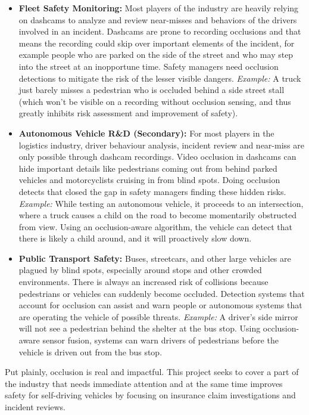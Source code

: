 \documentclass[12pt,a4paper]{report}
\theoremstyle{definition}
\theoremstyle{remark}
\begin{document}
\begin{itemize}
    \item \textbf{Fleet Safety Monitoring:} 
Most players of the industry are heavily relying on dashcams to analyze and review near-misses and behaviors of the drivers involved in an incident. Dashcams are prone to recording occlusions and that means the recording could skip over important elements of the incident, for example people who are parked on the side of the street and who may step into the street at an inopportune time. Safety managers need occlusion detections to mitigate the risk of the lesser visible dangers.
\textit{Example:} A truck just barely misses a pedestrian who is occluded behind a side street stall (which won't be visible on a recording without occlusion sensing, and thus greatly inhibits risk assessment and improvement of safety).

    \item \textbf{Autonomous Vehicle R\&D (Secondary):} 
For most players in the logistics industry, driver behaviour analysis, incident review and near-miss are only possible through dashcam recordings. Video occlusion in dashcams can hide important details like pedestrians coming out from behind parked vehicles and motorcyclists cruising in from blind spots. Doing occlusion detects that closed the gap in safety managers finding these hidden risks.
\textit{Example:} While testing an autonomous vehicle, it proceeds to an intersection, where a truck causes a child on the road to become momentarily obstructed from view. Using an occlusion-aware algorithm, the vehicle can detect that there is likely a child around, and it will proactively slow down.

    \item \textbf{Public Transport Safety:} 
Buses, streetcars, and other large vehicles are plagued by blind spots, especially around stops and other crowded environments. There is always an increased risk of collisions because pedestrians or vehicles can suddenly become occluded. Detection systems that account for occlusion can assist and warn people or autonomous systems that are operating the vehicle of possible threats.
\textit{Example:} A driver’s side mirror will not see a pedestrian behind the shelter at the bus stop. Using occlusion-aware sensor fusion, systems can warn drivers of pedestrians before the vehicle is driven out from the bus stop.
\end{itemize}

Put plainly, occlusion is real and impactful. This project seeks to cover a part of the industry that needs immediate attention and at the same time improves safety for self-driving vehicles by focusing on insurance claim investigations and incident reviews.
\end{document}
